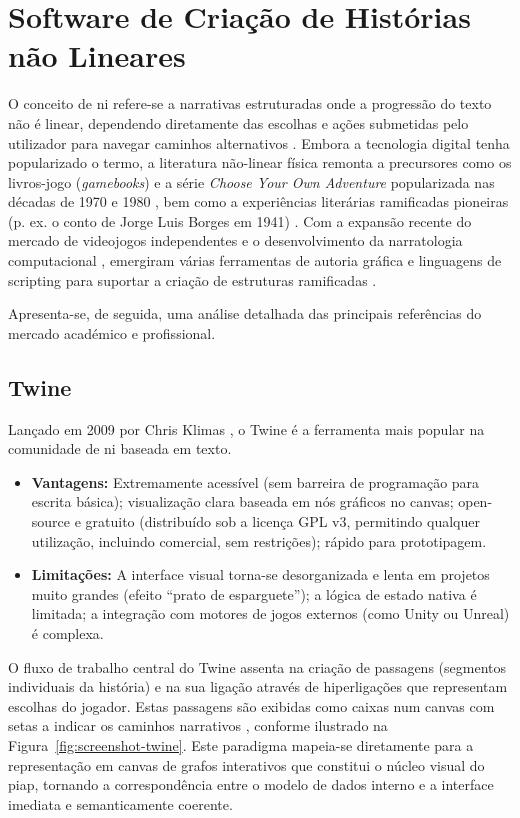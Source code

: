 \section{Software de Criação de Histórias não Lineares}
O conceito de \gls{ni} refere-se a narrativas estruturadas onde a progressão do texto não é linear, dependendo diretamente das escolhas e ações submetidas pelo utilizador para navegar caminhos alternativos \citep{Montfort2005}. Embora a tecnologia digital tenha popularizado o termo, a literatura não-linear física remonta a precursores como os livros-jogo (\textit{gamebooks}) e a série \textit{Choose Your Own Adventure} popularizada nas décadas de 1970 e 1980 \citep{Packer1984}, bem como a experiências literárias ramificadas pioneiras (p. ex. o conto de Jorge Luis Borges em 1941) \citep{Borges1941, Aarseth1997}. Com a expansão recente do mercado de videojogos independentes \citep{Juul2005, Adams2014} e o desenvolvimento da narratologia computacional \citep{Tang2022NGEP, YanTang2023Narrative}, emergiram várias ferramentas de autoria gráfica e linguagens de scripting para suportar a criação de estruturas ramificadas \citep{IFTFGDC2026}.

Apresenta-se, de seguida, uma análise detalhada das principais referências do mercado académico e profissional.

\subsection{Twine}
Lançado em 2009 por Chris Klimas \citep{TwineReference}, o Twine é a ferramenta mais popular na comunidade de \gls{ni} baseada em texto.
\begin{itemize}
    \item \textbf{Vantagens:} Extremamente acessível (sem barreira de programação para escrita básica); visualização clara baseada em nós gráficos no canvas; open-source e gratuito (distribuído sob a licença GPL v3, permitindo qualquer utilização, incluindo comercial, sem restrições); rápido para prototipagem.
    \item \textbf{Limitações:} A interface visual torna-se desorganizada e lenta em projetos muito grandes (efeito ``prato de esparguete''); a lógica de estado nativa é limitada; a integração com motores de jogos externos (como Unity ou Unreal) é complexa.
\end{itemize}

O fluxo de trabalho central do Twine assenta na criação de passagens (segmentos individuais da história) e na sua ligação através de hiperligações que representam escolhas do jogador. Estas passagens são exibidas como caixas num canvas com setas a indicar os caminhos narrativos \citep{TwineReference}, conforme ilustrado na Figura~\ref{fig:screenshot-twine}. Este paradigma mapeia-se diretamente para a representação em canvas de grafos interativos que constitui o núcleo visual do \gls{piap}, tornando a correspondência entre o modelo de dados interno e a interface imediata e semanticamente coerente.


